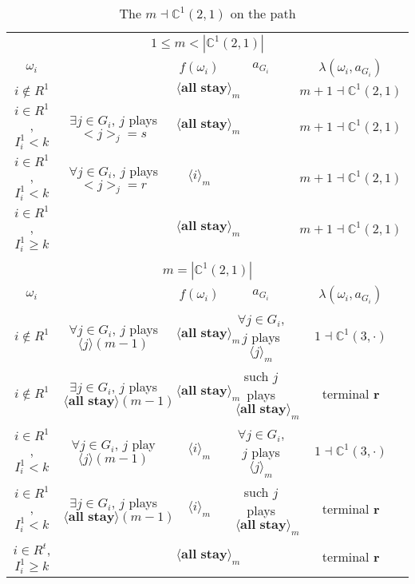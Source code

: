 \documentclass[12pt,letter]{article}
\newcommand{\Kappa}{\mathbb{C}}
\theoremstyle{definition}
\theoremstyle{remark}
\theoremstyle{claim}
\begin{document}
\begin{landscape}
\begin{table}[!htbp]
\caption{The $m\dashv\Kappa^1(2,1)$ on the path}
\label{table:eqm_path_k02}
\begin{center}
\begin{tabular}{c c | c | c | c}
\multicolumn{5}{c}{$1\leq m < |\Kappa^1(2,1)|$}\\
$\omega_i$ 	 & 	   &	$f(\omega_i)$  &	$a_{G_i}$ & $\lambda(\omega_i,a_{G_i})$ \\
\hline
\hline
$i\notin R^1$  	& & $\langle \textbf{all stay} \rangle_m$	&    & $m+1\dashv \Kappa^1(2,1)$\\
$i\in R^1$, $I^1_i< k$  	& $\exists j\in G_i$, $j$ plays $<j>_j=s$	& $\langle \textbf{all stay} \rangle_m$	& 	& $m+1\dashv \Kappa^1(2,1)$\\
$i\in R^1$, $I^1_i< k$  	& $\forall j\in G_i$, $j$ plays $<j>_j=r$ 	& $\langle i \rangle_m$	& 	& $m+1\dashv \Kappa^1(2,1)$\\
$i\in R^1$, $I^1_i\geq k$  	& 	& $\langle \textbf{all stay} \rangle_m$	&	& $m+1\dashv \Kappa^1(2,1)$\\
\hline
\\
\multicolumn{5}{c}{$m= |\Kappa^1(2,1)|$}\\
$\omega_i$ 	 & 	   &	$f(\omega_i)$  &	$a_{G_i}$ & $\lambda(\omega_i,a_{G_i})$ \\
\hline
\hline
$i\notin R^1$  	& $\forall j\in G_i$, $j$ plays $\langle j \rangle(m-1)$    & $\langle \textbf{all stay} \rangle_m$	& $\forall j\in G_i$, $j$ plays $\langle j \rangle_m$	& $1\dashv \Kappa^1(3,\cdot)$\\
$i\notin R^1$  	& $\exists j\in G_i$, $j$ plays $\langle \textbf{all stay} \rangle(m-1)$   & $\langle \textbf{all stay} \rangle_m$	& such $j$ plays $\langle \textbf{all stay} \rangle_m$	& terminal \textbf{r}\\
$i\in R^1$, $I^1_i< k$   	& $\forall j\in G_i$, $j$ play $\langle j \rangle(m-1)$ 	& $\langle i \rangle_m$	&  $\forall j\in G_i$, $j$ plays $\langle j \rangle_m$	& $1\dashv \Kappa^1(3,\cdot)$ \\
$i\in R^1$, $I^1_i< k$   	&  $\exists j\in G_i$, $j$ plays $\langle \textbf{all stay} \rangle(m-1)$ 	& $\langle i \rangle_m$	& such $j$ plays $\langle \textbf{all stay} \rangle_m$	&  terminal \textbf{r}\\
$i\in R^t$, $I^1_i\geq k$  	& 	& $\langle \textbf{all stay} \rangle_m$	& 	& terminal \textbf{r} \\
\hline
\end{tabular}
\end{center}
\end{table}

\end{landscape}
\end{document}
